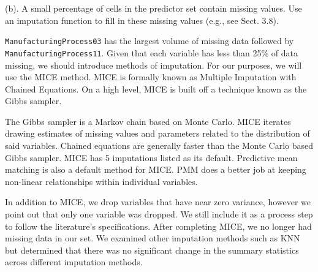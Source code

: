 \documentclass[]{report}
\begin{document}
\begin{subquestion}{(b).} A small percentage of cells in the predictor set contain missing values. Use an imputation function to fill in these missing values (e.g., see Sect. 3.8). 
\end{subquestion}

\texttt{ManufacturingProcess03} has the largest volume of missing data
followed by \texttt{ManufacturingProcess11}. Given that each variable
has less than 25\% of data missing, we should introduce methods of
imputation. For our purposes, we will use the MICE method. MICE is
formally known as Multiple Imputation with Chained Equations. On a high
level, MICE is built off a technique known as the Gibbs sampler.

The Gibbs sampler is a Markov chain based on Monte Carlo. MICE iterates
drawing estimates of missing values and parameters related to the
distribution of said variables. Chained equations are generally faster
than the Monte Carlo based Gibbs sampler. MICE has 5 imputations listed
as its default. Predictive mean matching is also a default method for
MICE. PMM does a better job at keeping non-linear relationships within
individual variables.

In addition to MICE, we drop variables that have near zero variance,
however we point out that only one variable was dropped. We still
include it as a process step to follow the literature's specifications.
After completing MICE, we no longer had missing data in our set. We
examined other imputation methods such as KNN but determined that there
was no significant change in the summary statistics across different
imputation methods.
\end{document}

